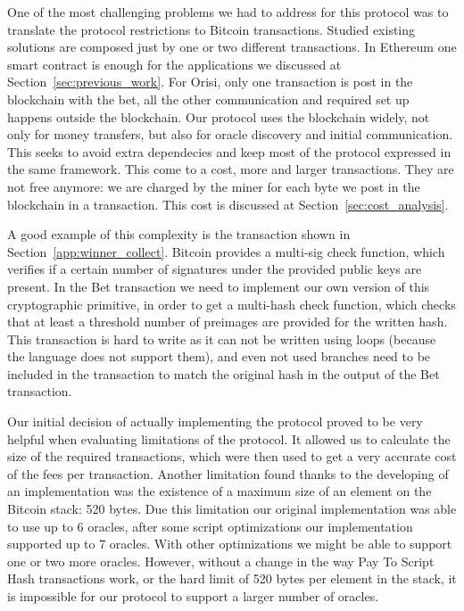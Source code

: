 One of the most challenging problems we had to address for this protocol was to
  translate the protocol restrictions to Bitcoin transactions.
Studied existing solutions are composed just by one or two different
  transactions.
In Ethereum one smart contract is enough for the applications we discussed at
  Section~\ref{sec:previous_work}.
For Orisi, only one transaction is post in the blockchain with the bet, all
  the other communication and required set up happens outside the blockchain.
Our protocol uses the blockchain widely, not only for money transfers, but also
  for oracle discovery and initial communication.
This seeks to avoid extra dependecies and keep most of the protocol expressed
  in the same framework.
This come to a cost, more and larger transactions.
They are not free anymore: we are charged by the miner for each byte we post in
  the blockchain in a transaction.
This cost is discussed at Section~\ref{sec:cost_analysis}.

A good example of this complexity is the transaction shown in
  Section~\ref{app:winner_collect}.
Bitcoin provides a multi-sig check function, which verifies if a certain number
  of signatures under the provided public keys are present.
In the Bet transaction we need to implement our own version of this
  cryptographic primitive, in order to get a multi-hash check function, which
  checks that at least a threshold number of preimages are provided for the
  written hash.
This transaction is hard to write as it can not be written using loops (because
  the language does not support them), and even not used branches need to be
  included in the transaction to match the original hash in the output of the
  Bet transaction.

Our initial decision of actually implementing the protocol proved to be very
  helpful when evaluating limitations of the protocol.
It allowed us to calculate the size of the required transactions, which were
  then used to get a very accurate cost of the fees per transaction.
Another limitation found thanks to the developing of an implementation was the
  existence of a maximum size of an element on the Bitcoin stack: 520 bytes.
Due this limitation our original implementation was able to use up to 6 oracles,
  after some script optimizations our implementation supported up to 7 oracles.
With other optimizations we might be able to support one or two more oracles.
However, without a change in the way Pay To Script Hash transactions work, or
  the hard limit of 520 bytes per element in the stack, it is impossible for our
  protocol to support a larger number of oracles.

